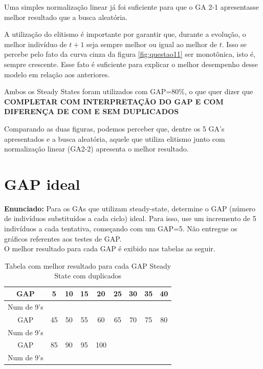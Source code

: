 \documentclass[12pt]{article}
\begin{document}
Uma simples normalização linear já foi suficiente para que o GA 2-1 apresentasse melhor resultado que a busca aleatória.

A utilização do elitismo é importante por garantir que, durante a evolução, o melhor indivíduo de $t+1$ seja sempre melhor ou igual ao melhor de $t$. Isso se percebe pelo fato da curva cinza da figura \ref{fig:questao11} ser monotônica, isto é, sempre crescente. Esse fato é suficiente para explicar o melhor desempenho desse modelo em relação aos anteriores.

Ambos os Steady States foram utilizados com GAP=80\%, o que quer dizer que \textbf{COMPLETAR COM INTERPRETAÇÃO DO GAP E COM DIFERENÇA DE COM E SEM DUPLICADOS}

Comparando as duas figuras, podemos perceber que, dentre os 5 GA's apresentados e a busca aleatória, aquele que utiliza elitismo junto com normalização linear (GA2-2) apresenta o melhor resultado.

\section{GAP ideal}
\textbf{Enunciado:} Para os GAs que utilizam steady-state, determine o GAP (número de indivíduos substituídos a cada ciclo) ideal. Para isso, use um incremento de 5 indivíduos a cada tentativa, começando com um GAP=5. Não entregue os gráficos referentes aos testes de GAP.\\

O melhor resultado para cada GAP é exibido nas tabelas as seguir.

\begin{table}[H]
	\centering
	\begin{tabular}{|c|c|c|c|c|c|c|c|c|}
		\hline
		GAP & 5 & 10 & 15 & 20 & 25 & 30 & 35 & 40 \\
		\hline
		Num de 9's &  &  &  &  &  &  &  &  \\
		\hline
		GAP & 45 & 50 & 55 & 60 & 65 & 70 & 75 & 80 \\
		\hline
		Num de 9's &  &  &  &  &  &  &  &  \\
		\hline
		GAP & 85 & 90 & 95 & 100 &  &  &  &  \\
		\hline
		Num de 9's &  &  &  &  &  &  &  &  \\
		\hline
	\end{tabular}
	\caption{Tabela com melhor resultado para cada GAP Steady State com duplicados}
\end{table}
\end{document}

